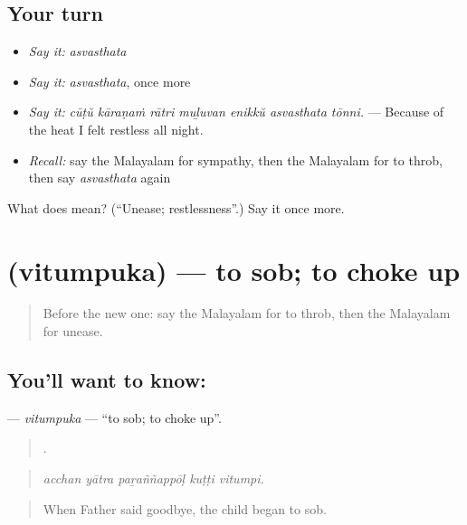 \subsection*{Your turn}
\begin{itemize}
\raggedright
  \item \emph{Say it:} \emph{asvasthata}
  \item \emph{Say it:} \emph{asvasthata}, once more
  \item \emph{Say it:} \emph{cūṭŭ kāraṇaṁ rātri muḻuvan enikkŭ asvasthata tōnni.} — Because of the heat I felt restless all night.
  \item \emph{Recall:} say the Malayalam for sympathy, then the Malayalam for to throb, then say \emph{asvasthata} again
\end{itemize}

\begin{tcolorbox}[breakable,colback=teal!4,colframe=teal!35!black,title={Before you move on}]
What does  mean? (\textquotedblleft{}Unease; restlessness\textquotedblright{}.) Say it once more.
\end{tcolorbox}
\section[\texorpdfstring{\ml{വിതുമ്പുക} (vitumpuka)}{വിതുമ്പുക (vitumpuka)}]{ (vitumpuka) — to sob; to choke up}

\label{lesson:ML-C520-vitumpuka}



\begin{quote}
Before the new one: say the Malayalam for to throb, then the Malayalam for unease.
\end{quote}

\subsection*{You'll want to know: }
\textbf{} — \emph{vitumpuka} — \textquotedblleft{}to sob; to choke up\textquotedblright{}.

\begin{quote}
    .
\end{quote}

\begin{quote}
\emph{acchan yātra paṟaññappōḷ kuṭṭi vitumpi.}
\end{quote}

\begin{quote}
When Father said goodbye, the child began to sob.
\end{quote}

